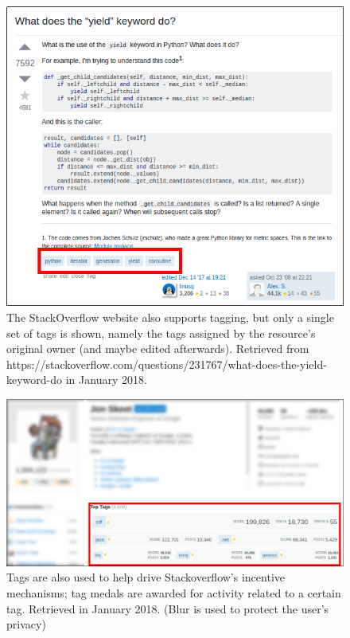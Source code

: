 \begin{figure}[H]
    \centering
    \includegraphics[width=\textwidth]{chapters/02_social_tagging/images/stackoverflow.png}
    \caption{The StackOverflow website also supports tagging, but only a single set of tags is shown, namely the tags assigned by the resource's original owner (and maybe edited afterwards). Retrieved from https://stackoverflow.com/questions/231767/what-does-the-yield-keyword-do in January 2018. }
    \label{fig:stackoverflow}
\end{figure}

\begin{figure}[H]
    \centering
    \includegraphics[width=\textwidth]{chapters/02_social_tagging/images/jon_skeet.png}
    \caption{Tags are also used to help drive Stackoverflow's incentive mechanisms; tag medals are awarded for activity related to a certain tag. Retrieved in January 2018. (Blur is used to protect the user's privacy)}
    \label{fig:jon_skeet}
\end{figure}

